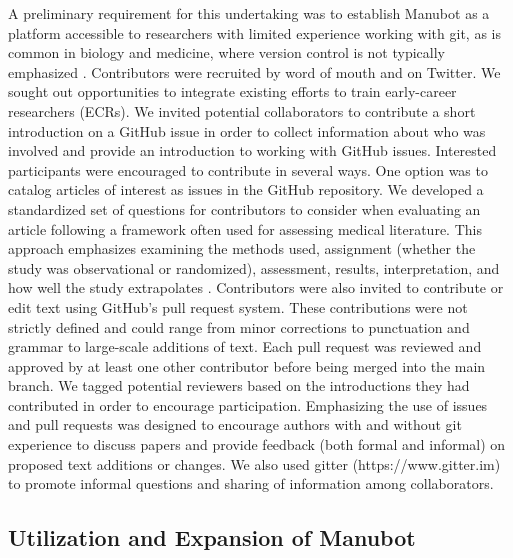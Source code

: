 \documentclass[sigconf]{acmart}
\begin{document}
A preliminary requirement for this undertaking was to establish Manubot as a platform accessible to researchers with limited experience working with git, as is common in biology and medicine, where version control is not typically emphasized \citep{1HmO21gZN, OO1DuZd, 4ny1onB0}.
Contributors were recruited by word of mouth and on Twitter.
We sought out opportunities to integrate existing efforts to train early-career researchers (ECRs).
We invited potential collaborators to contribute a short introduction on a GitHub issue in order to collect information about who was involved and provide an introduction to working with GitHub issues.
Interested participants were encouraged to contribute in several ways.
One option was to catalog articles of interest as issues in the GitHub repository.
We developed a standardized set of questions for contributors to consider when evaluating an article following a framework often used for assessing medical literature.
This approach emphasizes examining the methods used, assignment (whether the study was observational or randomized), assessment, results, interpretation, and how well the study extrapolates \citep{17OQtAY4l}.
Contributors were also invited to contribute or edit text using GitHub's pull request system.
These contributions were not strictly defined and could range from minor corrections to punctuation and grammar to large-scale additions of text.
Each pull request was reviewed and approved by at least one other contributor before being merged into the main branch.
We tagged potential reviewers based on the introductions they had contributed in order to encourage participation.
Emphasizing the use of issues and pull requests was designed to encourage authors with and without git experience to discuss papers and provide feedback (both formal and informal) on proposed text additions or changes.
We also used gitter (https://www.gitter.im) to promote informal questions and sharing of information among collaborators.

\hypertarget{utilization-and-expansion-of-manubot}{%
\subsection{Utilization and Expansion of Manubot}\label{utilization-and-expansion-of-manubot}}
\end{document}
